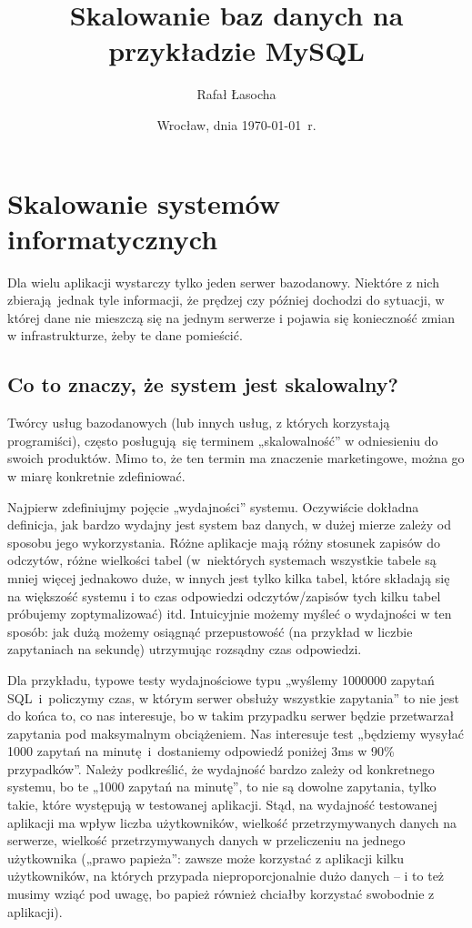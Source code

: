 \documentclass[a4paper,12pt]{article}
\title{{\textbf{Skalowanie baz danych na przykładzie MySQL}}}
\author{Rafał Łasocha}
\date{Wrocław, dnia \today\ r.}
\begin{document}
\maketitle

\section{Skalowanie systemów informatycznych}

Dla wielu aplikacji wystarczy tylko jeden serwer bazodanowy. Niektóre z nich zbierają jednak tyle informacji, że prędzej czy później dochodzi do sytuacji, w której dane nie mieszczą się na jednym serwerze i pojawia się konieczność zmian w infrastrukturze, żeby te dane pomieścić.

\subsection{Co to znaczy, że system jest skalowalny?}

Twórcy usług bazodanowych (lub innych usług, z których korzystają programiści), często posługują się terminem „skalowalność” w odniesieniu do swoich produktów. Mimo to, że ten termin ma znaczenie marketingowe, można go w miarę konkretnie zdefiniować. 

Najpierw zdefiniujmy pojęcie „wydajności” systemu. Oczywiście dokładna definicja, jak bardzo wydajny jest system baz danych, w dużej mierze zależy od sposobu jego wykorzystania.  Różne aplikacje mają różny stosunek zapisów do odczytów, różne wielkości tabel (w~niektórych systemach wszystkie tabele są mniej więcej jednakowo duże, w innych jest tylko kilka tabel, które składają się na większość systemu i to czas odpowiedzi odczytów/zapisów tych kilku tabel próbujemy zoptymalizować) itd. Intuicyjnie możemy myśleć o wydajności w ten sposób: jak dużą możemy osiągnąć przepustowość (na przykład w liczbie zapytaniach na sekundę) utrzymując rozsądny czas odpowiedzi.

Dla przykładu, typowe testy wydajnościowe typu „wyślemy 1000000 zapytań SQL~i~policzymy czas, w którym serwer obsłuży wszystkie zapytania” to nie jest do końca to, co nas interesuje, bo w takim przypadku serwer będzie przetwarzał zapytania pod maksymalnym obciążeniem. Nas interesuje test „będziemy wysyłać 1000 zapytań na minutę~i~dostaniemy odpowiedź poniżej 3ms w 90\% przypadków”. Należy podkreślić, że wydajność bardzo zależy od konkretnego systemu, bo te „1000 zapytań na minutę”, to nie są dowolne zapytania, tylko takie, które występują w testowanej aplikacji. Stąd, na wydajność testowanej aplikacji ma wpływ liczba użytkowników, wielkość przetrzymywanych danych na serwerze, wielkość przetrzymywanych danych w przeliczeniu na jednego użytkownika („prawo papieża”: zawsze może korzystać z aplikacji kilku użytkowników, na których przypada nieproporcjonalnie dużo danych – i to też musimy wziąć pod uwagę, bo papież również chciałby korzystać swobodnie z aplikacji).
\end{document}
